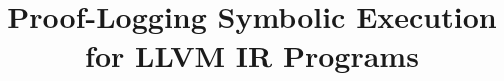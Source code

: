 \documentclass[runningheads]{llncs}
\begin{document}
\title{Proof-Logging Symbolic Execution for LLVM IR Programs}

\author{}
\institute{}

\maketitle

\begin{abstract}

\end{abstract}










%

\newpage




\newpage

\appendix

\end{document}
